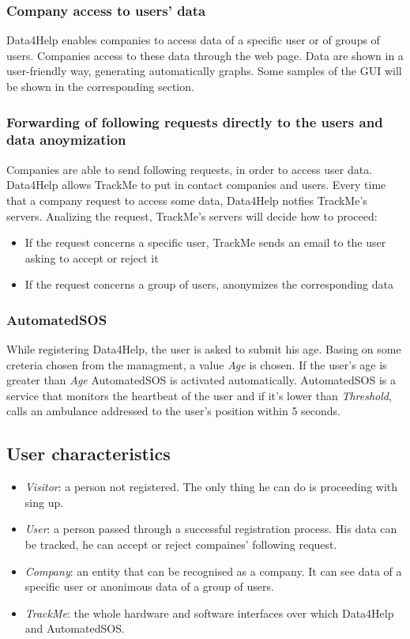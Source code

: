 \documentclass{article}
\begin{document}
\subsubsection{Company access to users' data}
Data4Help enables companies to access data of a specific user or of groups of users. Companies access to these data through the web page. Data are shown in a user-friendly way, generating automatically graphs. Some samples of the GUI will be shown in the corresponding section.
\subsubsection{Forwarding of following requests directly to the users and data anoymization}
Companies are able to send following requests, in order to access user data. Data4Help allows TrackMe to put in contact companies and users. Every time that a company request to access some data, Data4Help notfies TrackMe's servers. Analizing the request, TrackMe's servers will decide how to proceed:\\
\begin{itemize}
\item If the request concerns a specific user, TrackMe sends an email to the user asking to accept or reject it
\item If the request concerns a group of users, anonymizes the corresponding data 
\end{itemize}
\subsubsection{AutomatedSOS}
While registering Data4Help, the user is asked to submit his age. Basing on some creteria chosen from the managment, a value \emph{Age} is chosen. If the user's age is greater than \emph{Age} AutomatedSOS is activated automatically. AutomatedSOS is a service that monitors the heartbeat of the user and if it's lower than \emph{Threshold}, calls an ambulance addressed to the user's position within 5 seconds.
\subsection{User characteristics}
\begin{itemize}
\item \emph{Visitor}: a person not registered. The only thing he can do is proceeding with sing up.
\item \emph{User}: a person passed through a successful registration process. His data can be tracked, he can accept or reject compaines' following request.
 \item \emph{Company}: an entity that can be recognised as a company. It can see data of a specific user or anonimous data of a group of users. 
 \item \emph{TrackMe}: the whole hardware and software interfaces over which Data4Help and AutomatedSOS.
\end{itemize}
\end{document}
